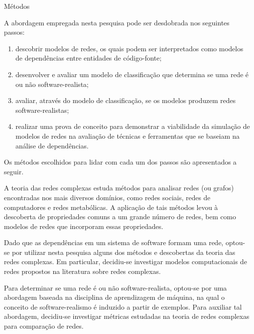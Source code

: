 \begin{section}{Métodos}
	
	A abordagem empregada nesta pesquisa pode ser desdobrada nos seguintes passos:
	
	\begin{enumerate}
		\item descobrir modelos de redes, os quais podem ser interpretados como modelos de dependências entre entidades de código-fonte;
		\item desenvolver e avaliar um modelo de classificação que determina se uma rede é ou não software-realista;
		\item avaliar, através do modelo de classificação, se os modelos produzem redes software-realistas;
		\item realizar uma prova de conceito para demonstrar a viabilidade da simulação de modelos de redes na avaliação de técnicas e ferramentas que se baseiam na análise de dependências.
	\end{enumerate}
	
	Os métodos escolhidos para lidar com cada um dos passos são apresentados a seguir.
	
	A teoria das redes complexas estuda métodos para analisar redes (ou grafos) encontradas nos mais diversos domínios, como redes sociais, redes de computadores e redes metabólicas. A aplicação de tais métodos levou à descoberta de propriedades comuns a um grande número de redes, bem como modelos de redes que incorporam essas propriedades.
	
	Dado que as dependências em um sistema de software formam uma rede, optou-se por utilizar nesta pesquisa alguns dos métodos e descobertas da teoria das redes complexas. Em particular, decidiu-se investigar modelos computacionais de redes propostos na literatura sobre redes complexas.

	Para determinar se uma rede é ou não software-realista, optou-se por uma abordagem baseada na disciplina de aprendizagem de máquina, na qual o conceito de software-realismo é induzido a partir de exemplos. Para auxiliar tal abordagem, decidiu-se investigar métricas estudadas na teoria de redes complexas para comparação de redes.
	
	

\end{section}
